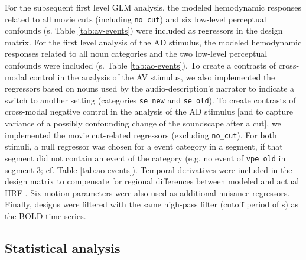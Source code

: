 \documentclass[english]{article}
\begin{document}
For the subsequent first level GLM analysis, the modeled hemodynamic responses
related to all movie cuts (including \texttt{no\_cut}) and six low-level
perceptual confounds (s. Table \ref{tab:av-events}) were included as regressors
in the design matrix.
For the first level analysis of the AD stimulus, the modeled hemodynamic
responses related to all noun categories and the two low-level perceptual
confounds were included (s. Table \ref{tab:ao-events}).
To create a contrasts of cross-modal control in the analysis of the AV stimulus,
we also implemented the regressors based on nouns used by the
audio-description's narrator to indicate a switch to another setting (categories
\texttt{se\_new} and \texttt{se\_old}).
To create contrasts of cross-modal negative control in the analysis of the AD
stimulus [and to capture variance of a possibly confounding change of the
soundscape after a cut], we implemented the movie cut-related regressors
(excluding \texttt{no\_cut}).
For both stimuli, a null regressor was chosen for a event category in a segment,
if that segment did not contain an event of the category (e.g. no event of
\texttt{vpe\_old} in segment 3; cf. Table \ref{tab:ao-events}).
Temporal derivatives were included in the design matrix to compensate for
regional differences between modeled and actual HRF \citep{friston1998event}.
Six motion parameters were also used as additional nuisance regressors.
Finally, designs were filtered with the same high-pass filter (cutoff period of
\unit[150]{s}) as the BOLD time series.


\subsection{Statistical analysis}


\end{document}
